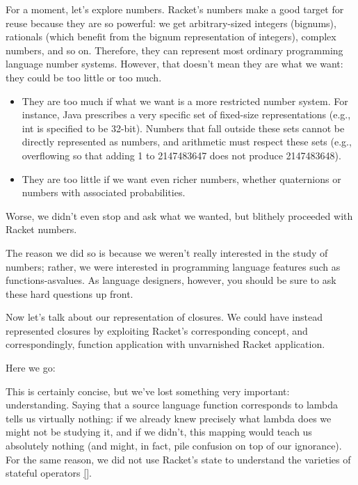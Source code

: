 
For a moment, let’s explore numbers. Racket’s numbers make a good target for
reuse because they are so powerful: we get arbitrary-sized integers (bignums),
rationals (which benefit from the bignum representation of integers), complex
numbers, and so on. Therefore, they can represent most ordinary programming
language number systems. However, that doesn’t mean they are what we want: they
could be too little or too much.
\begin{itemize}
  \item 
They are too much if what we want is a more restricted number system. For
instance, Java prescribes a very specific set of fixed-size representations
(e.g., int is specified to be 32-bit). Numbers that fall outside these sets
cannot be directly represented as numbers, and arithmetic must respect these
sets (e.g., overflowing so that adding 1 to 2147483647 does not produce
2147483648).
  \item 
They are too little if we want even richer numbers, whether quaternions or
numbers with associated probabilities.
\end{itemize}
Worse, we didn’t even stop and ask what we wanted, but blithely proceeded with
Racket numbers.

The reason we did so is because we weren’t really interested in the study of
numbers; rather, we were interested in programming language features such as
functions-asvalues. As language designers, however, you should be sure to ask
these hard questions up front.

Now let’s talk about our representation of closures. We could have instead
represented closures by exploiting Racket’s corresponding concept, and
correspondingly, function application with unvarnished Racket application.


Here we go:


This is certainly concise, but we’ve lost something very important:
understanding. Saying that a source language function corresponds to lambda
tells us virtually nothing: if we already knew precisely what lambda does we
might not be studying it, and if we didn’t, this mapping would teach us
absolutely nothing (and might, in fact, pile confusion on top of our ignorance).
For the same reason, we did not use Racket’s state to understand the varieties
of stateful operators \ref{}.

